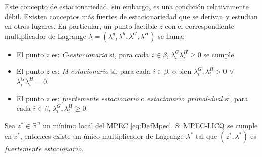 Este concepto de estacionariedad, sin embargo, es una condición relativamente débil. Existen conceptos más fuertes de estacionariedad que se derivan y estudian en otros lugares. En particular, un punto factible $z$ con el correspondiente multiplicador de Lagrange $\lambda = (\lambda^g, \lambda^h, \lambda^G, \lambda^H)$ se llama:

\begin{itemize}
\item \begin{definition}
  El punto $z$ es: \textit{C-estacionario} si, para cada $i \in \beta$, $\lambda_i^G\lambda_i^H \geq 0$ se cumple.
\end{definition}
\item \begin{definition}
    El punto $z$ es: \textit{M-estacionario} si, para cada $i \in \beta$, o bien $\lambda_i^G,\lambda_i^H > 0$ $\vee$ $\lambda_i^G \lambda_i^H = 0$.
\end{definition}
\item \begin{definition}
    El punto $z$ es: \textit{fuertemente estacionario} o \textit{estacionario primal-dual} si, para cada $i \in \beta$, $\lambda_i^G, \lambda_i^H \geq 0$.
\end{definition}
\end{itemize}


\begin{theorem} 
Sea $z^* \in \mathbb{R}^n$ un mínimo local del MPEC \eqref{eq:DefMpec}. Si MPEC-LICQ se cumple en $z^*$, entonces existe un único multiplicador de Lagrange $\lambda^*$ tal que $(z^*, \lambda^*)$ es \textit{fuertemente estacionario}.
\end{theorem}

